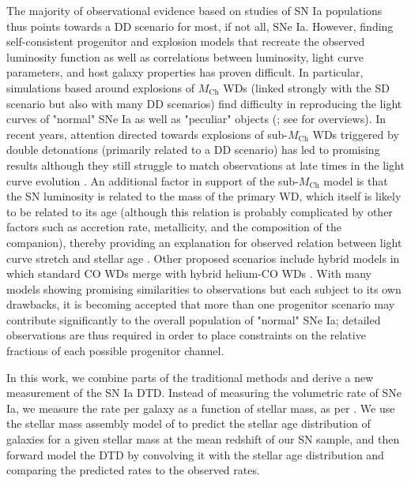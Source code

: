 \documentclass[fleqn,usenatbib]{mnras}
\begin{document}
The majority of observational evidence based on studies of SN Ia populations thus points towards a DD scenario for most, if not all, SNe Ia. However, finding self-consistent progenitor and explosion models that recreate the observed luminosity function as well as correlations between luminosity, light curve parameters, and host galaxy properties has proven difficult. In particular, simulations based around explosions of $M_{\mathrm{Ch}}$ WDs (linked strongly with the SD scenario but also with many DD scenarios) find difficulty in reproducing the light curves of "normal" SNe Ia as well as "peculiar" objects (\citealt{Ropke2007,Sim2013,Blondin2017}; see \citealt{Maoz2014,Jha2019} for overviews). In recent years, attention directed towards explosions of sub-$M_{\mathrm{Ch}}$ WDs triggered by double detonations (primarily related to a DD scenario) has led to promising results \citep[e.g.][]{Shen2017,Shen2018,Townsley2019,Gronow2020,Shen2021} although they still struggle to match observations at late times in the light curve evolution \citep{Shen2021,Gronow2021}. An additional factor in support of the sub-$M_{\mathrm{Ch}}$ model is that the SN luminosity is related to the mass of the primary WD, which itself is likely to be related to its age (although this relation is probably complicated by other factors such as accretion rate, metallicity, and the composition of the companion), thereby providing an explanation for observed relation between light curve stretch and stellar age \citep{Rigault2013,Rigault2018,Rose2019,Nicolas2020}. Other proposed scenarios include hybrid models in which standard CO WDs merge with hybrid helium-CO WDs \citep{Zenati2019,Perets2019}. With many models showing promising similarities to observations but each subject to its own drawbacks, it is becoming accepted that more than one progenitor scenario may contribute significantly to the overall population of "normal" SNe Ia; detailed observations are thus required in order to place constraints on the relative fractions of each possible progenitor channel. 

In this work, we combine parts of the traditional methods and derive a new measurement of the SN Ia DTD. Instead of measuring the volumetric rate of SNe Ia, we measure the rate per galaxy as a function of stellar mass, as per \citet{Sullivan2006,Smith2012,Brown2019}. We use the stellar mass assembly model of  to predict the stellar age distribution of galaxies for a given stellar mass at the mean redshift of our SN sample, and then forward model the DTD by convolving it with the stellar age distribution and comparing the predicted rates to the observed rates.
\end{document}
